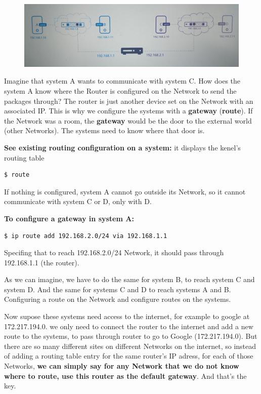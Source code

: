 \documentclass{article}
\newenvironment{codetemplate}[1][]{%
  \mybasecolorbox[#1]
  \itshape
}{%
  \endmybasecolorbox
}
\begin{document}
\begin{figure}[H]
    \includegraphics[width=\textwidth]{pictures/ntw4.png}
\end{figure}

Imagine that system A wants to communicate with system C. How does the system 
A know where the Router is configured on the Network to send the packages through? 
The router is just another device set on the Network with an associated IP. This is why we configure the systems with a \textbf{gateway} (\textbf{route}). If the Network was a room, the \textbf{gateway} would be the door to the external world (other Networks). The systems need to know where that door is. 

\textbf{See existing routing configuration on a system:} it displays the kenel's routing table
\begin{codetemplate}{}
\begin{verbatim}
$ route
\end{verbatim}
\end{codetemplate}

If nothing is configured, system A cannot go outside its Network, so it cannot communicate with system C or D, only with D.

\textbf{To configure a gateway in system A:}
\begin{codetemplate}{}
\begin{verbatim}
$ ip route add 192.168.2.0/24 via 192.168.1.1
\end{verbatim}
\end{codetemplate}

Specifing that to reach 192.168.2.0/24 Network, it should pass through 192.168.1.1 (the router).

As we can imagine, we have to do the same for system B, to reach system C and system D. And the same for systems C and D to reach systems A and B. Configuring a route on the Network and configure routes on the systems.

Now supose these systems need access to the internet, for example to google at 172.217.194.0. we only need to connect the router to the internet and add a new route to the systems, to pass through router to go to Google (172.217.194.0). But there are so many different sites on different Networks on the internet, so instead of adding a routing table entry for the same router's IP adress, for each of those Networks, \textbf{we can simply say for any Network that we do not know where to route, use this router as the default gateway}. And that's the key.
\end{document}
